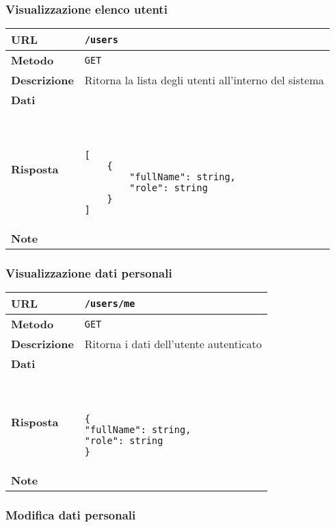     \subsubsection{Visualizzazione elenco utenti}

        \begin{tabular}{|l|l|} 
            \hline
            \textbf{URL} & \texttt{/users} \\ \hline
            \textbf{Metodo} & \texttt{GET} \\ \hline
            \textbf{Descrizione} & 
                Ritorna la lista degli utenti all'interno del sistema \\ \hline
            \textbf{Dati} & \\ \hline
            \textbf{Risposta} & \
                \begin{lstlisting}[basicstyle={\ttfamily}]
[
    {
        "fullName": string,
        "role": string
    }
]
                \end{lstlisting} \\ \hline
            \textbf{Note} & \\ \hline
        \end{tabular}

    \subsubsection{Visualizzazione dati personali}

        \begin{tabular}{|l|l|} 
            \hline
            \textbf{URL} & \texttt{/users/me} \\ \hline
            \textbf{Metodo} & \texttt{GET} \\ \hline
            \textbf{Descrizione} & 
                Ritorna i dati dell'utente autenticato \\ \hline
            \textbf{Dati} & \\ \hline
            \textbf{Risposta} & \
                \begin{lstlisting}[basicstyle={\ttfamily}]
{
"fullName": string,
"role": string
}
                \end{lstlisting} \\ \hline
            \textbf{Note} & \\ \hline
        \end{tabular}

    \subsubsection{Modifica dati personali}

